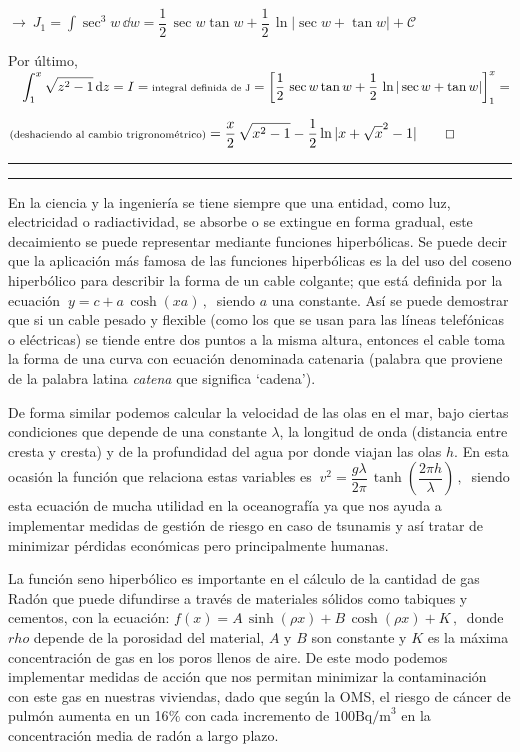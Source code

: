 $\to \displaystyle \ J_1=\int \sec^3 w \, \dd w = \dfrac 1 2 \, \sec w \tan w+\dfrac 1 2 \, \ln |\sec w + \tan w| + \mathcal C$

\normalsize{Por} último, $\quad \displaystyle \int_1^x \sqrt{z^2-1}\, \dd z = I=\text{\scriptsize{integral definida de J}} =  \left[  \dfrac 1 2 \, \sec w \tan w+\dfrac 1 2 \, \ln |\sec w + \tan w| \right]_1^x=$

$\text{\scriptsize{(deshaciendo al cambio trigronométrico)}} =\displaystyle \dfrac x 2 \, \sqrt{x^2-1} - \dfrac 1 2 \ln|x+\sqrt
x^2-1| \qquad \Box$


\vspace{-5mm}
\begin{flushright}\rule{250pt}{0.1pt}	\end{flushright}
\color{black}




\vspace{5mm}
\newpage %
\color{teal}
\rule{250pt}{0.2pt}	

En la ciencia y la ingeniería se tiene siempre que una entidad, como luz,  electricidad  o  radiactividad, se  absorbe  o  se  extingue  en  forma  gradual,  este decaimiento se puede representar mediante funciones hiperbólicas. Se puede decir que  la  aplicación  más  famosa  de  las  funciones  hiperbólicas  es  la  del uso  del  coseno hiperbólico para describir la forma de un cable colgante; que está definida por la ecuación $\ y=c+a\,\cosh (xa)\, , \ $  siendo $a$ una constante.  Así se puede demostrar que si un cable pesado y flexible (como los que se usan para las líneas telefónicas o eléctricas) se tiende entre dos  puntos a la misma altura, entonces el cable toma la forma de una curva con ecuación denominada catenaria (palabra  que proviene de  la palabra latina  \emph{catena} que significa `cadena').

De forma similar podemos calcular la velocidad de las olas en el mar, bajo ciertas condiciones  que depende de una constante $\lambda$, la longitud de onda (distancia entre cresta y cresta) y de la profundidad del agua por donde viajan las olas $h$.  En esta ocasión la función que relaciona estas variables es $\ v^2=\dfrac{g\lambda}{2\pi} \, \tanh \left( \dfrac{2\pi h}{\lambda} \right) \, , \ $ siendo esta ecuación de mucha utilidad en la oceanografía ya que nos ayuda a implementar medidas de gestión de  riesgo  en  caso  de  tsunamis  y  así  tratar  de  minimizar  pérdidas  económicas  pero principalmente humanas.

La función seno hiperbólico es importante en el cálculo de la cantidad de gas Radón que puede difundirse a través de materiales sólidos como tabiques y cementos, con la ecuación: $f(x)=A\, \sinh (\rho x) + B \, \cosh(\rho x) + K\, , \ $  donde $rho$ depende de la porosidad del material, $A$ y $B$ son constante y $K$ es la máxima concentración de gas en los poros llenos de aire. De este modo podemos implementar medidas de acción que nos permitan minimizar la contaminación con este gas en nuestras viviendas, dado que según la OMS, el riesgo de cáncer de pulmón aumenta en un 16$\%$ con cada incremento de $100 \mathrm{Bq/m}^3$ en la concentración media de radón a largo plazo.  

